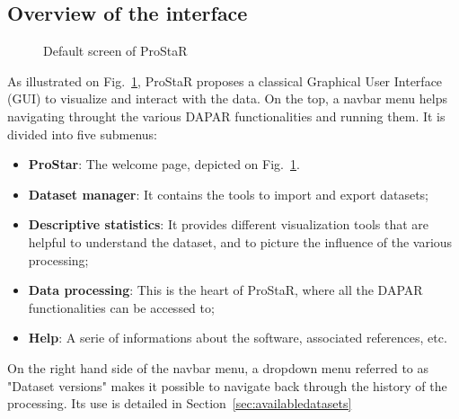 \documentclass[12pt]{article}
\begin{document}
\subsection{Overview of the interface}

\begin{figure}
\centering
{}
\caption{Default screen of ProStaR}\label{fig:vuegal}
\end{figure}

{As illustrated on Fig.~\ref{fig:vuegal}, ProStaR proposes a classical Graphical User Interface (GUI) to visualize and interact with the data. On the top, a navbar menu helps navigating throught the various DAPAR functionalities and running them. It is divided into five submenus:
\begin{itemize}
  \item \textbf {ProStar}: The welcome page, depicted on Fig.~\ref{fig:vuegal}.
  \item \textbf {Dataset manager}: It contains the tools to import and export datasets;
  \item \textbf {Descriptive statistics}: It provides different visualization tools that are helpful to understand the dataset, and to picture the influence of the various processing;
  \item \textbf {Data processing}: This is the heart of ProStaR, where all the DAPAR functionalities can be accessed to; 
  \item \textbf {Help}: A serie of informations about the software, associated references, etc.
\end{itemize}
}

{On the right hand side of the navbar menu, a dropdown menu referred to as "Dataset versions" makes it possible to navigate back through the history of the processing. Its use is detailed in Section~\ref{sec:availabledatasets}
}


\end{document}
